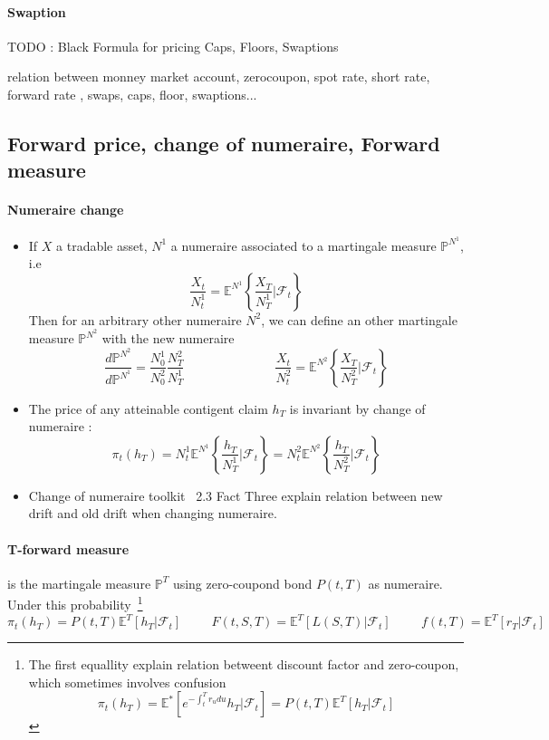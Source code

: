 \documentclass[a4paper,10pt]{article}
\newcommand{\E}{\mathbb{E}}
\newcommand{\Proba}{\mathbb{P}}
\newcommand{\F}{\mathcal{F}}
\newcommand{\PtT}{P(t,T)}
\newcommand{\todo}[1]{\begin{center}\color{red} TODO : #1\end{center}}
\begin{document}
\paragraph{Swaption}
\todo{Black Formula for pricing Caps, Floors, Swaptions}  


relation between monney market account, zerocoupon, spot rate, short rate, forward rate , swaps, caps, floor, swaptions... 
\subsection{Forward price, change of numeraire, Forward measure}
\paragraph{Numeraire change}
\begin{itemize}[label={--}]
 \item If $X$ a tradable asset, $N^1$ a numeraire associated to a martingale measure $\Proba^{N^1}$, i.e 
 \[
 \frac{X_t}{N^1_t} = \E^{N^1}\left\{ \frac{X_T}{N^1_T}| \mathcal{F}_t \right\}
 \]
 Then for an arbitrary other numeraire $N^2$, we can define an other martingale measure $\Proba^{N^2}$ with the new numeraire
 \[
 \frac{d\Proba^{N^2}}{d\Proba^{N^1}}=\frac{N^1_0}{N^2_0}\frac{N^2_T}{N^1_T}
 \hspace{3cm}
 \frac{X_t}{N^2_t} = \E^{N^2}\left\{ \frac{X_T}{N^2_T}| \mathcal{F}_t \right\}
 \]
 \item The price of any atteinable contigent claim $h_T$ is invariant by change of numeraire :
 \[
 \pi_t(h_T) = N^1_t \E^{N^1}\left\{ \frac{h_T}{N^1_T}| \mathcal{F}_t \right\} = N^2_t\E^{N^2}\left\{ \frac{h_T}{N^2_T}| \mathcal{F}_t \right\}
 \]
 \item Change of numeraire toolkit ~\cite{BRIGO2006}2.3 Fact Three explain relation between new drift and old drift when changing numeraire.
\end{itemize}

\paragraph{T-forward measure} is the martingale measure $\Proba^{T}$ using zero-coupond bond $\PtT$ as numeraire. Under this probability~\footnote{The first equallity explain relation betweent discount factor and zero-coupon, which sometimes involves confusion \[\pi_t(h_T)=\E^{*}[e^{-\int^T_t r_udu}h_T|\F_t]= \PtT\E^{T}[h_T|\F_t]\]}
\[
\pi_t(h_T)=\PtT\E^{T}[h_T|\F_t]
\hspace{1cm}
F(t,S,T)=\E^{T}[L(S,T)|\F_t]
\hspace{1cm}
f(t,T)=\E^{T}[r_T|\F_t]
\]
\end{document}
